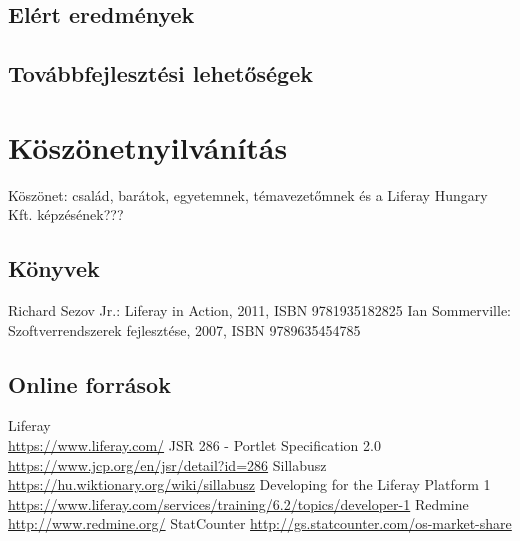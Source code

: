 \documentclass[hidelinks, 12pt, a4paper]{report}
\begin{document}
\section{Elért eredmények}

\section{Továbbfejlesztési lehetőségek}

\clearpage
{}
\chapter*{Köszönetnyilvánítás}

Köszönet: család, barátok, egyetemnek, témavezetőmnek és a Liferay Hungary Kft. képzésének???


\clearpage
{}
\begin{thebibliography}{10}

\section*{Könyvek}

 Richard Sezov Jr.: Liferay in Action, 2011, ISBN 9781935182825
 Ian Sommerville: Szoftverrendszerek fejlesztése, 2007, ISBN 9789635454785

\section*{Online források}

 Liferay \\ \small\url{https://www.liferay.com/}
 JSR 286 - Portlet Specification 2.0 \\ \small\url{https://www.jcp.org/en/jsr/detail?id=286}
 Sillabusz \\ \small\url{https://hu.wiktionary.org/wiki/sillabusz}
 Developing for the Liferay Platform 1 \\ \small\url{https://www.liferay.com/services/training/6.2/topics/developer-1}
 Redmine \\ \small\url{http://www.redmine.org/}
 StatCounter \small\url{http://gs.statcounter.com/os-market-share}

\end{thebibliography}
\end{document}
